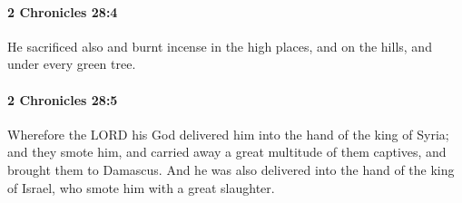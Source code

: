 		\paragraph{2 Chronicles 28:4} %
			\label{2CHRONICLES-28-4}

			He sacrificed also and burnt incense in the high places, and on the hills, and under every green tree.


		\paragraph{2 Chronicles 28:5} %
			\label{2CHRONICLES-28-5}

			Wherefore the LORD his God delivered him into the hand of the king of Syria; and they smote him, and carried away a great multitude of them captives, and brought them to Damascus. And he was also delivered into the hand of the king of Israel, who smote him with a great slaughter.

